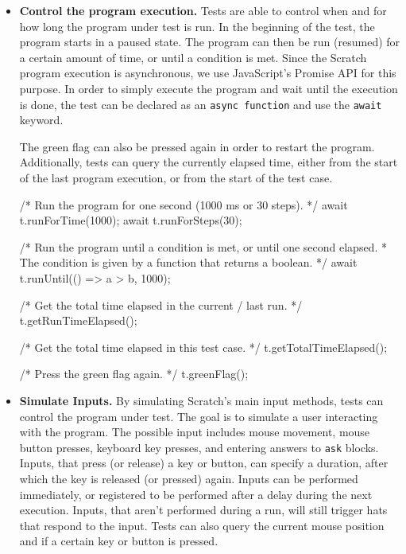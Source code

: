 \begin{itemize}
    \item \textbf{Control the program execution.}
        Tests are able to control when and for how long the program under test is run.
        In the beginning of the test, the program starts in a paused state.
        The program can then be run (resumed) for a certain amount of time, or until a condition is met.
        Since the Scratch program execution is asynchronous, we use JavaScript's Promise API for this purpose.
        In order to simply execute the program and wait until the execution is done, the test can be declared as an \texttt{async function} and use the \texttt{await} keyword.

        The green flag can also be pressed again in order to restart the program.
        Additionally, tests can query the currently elapsed time,
        either from the start of the last program execution,
        or from the start of the test case.
        \begin{javascriptcode}
            /* Run the program for one second (1000 ms or 30 steps). */
            await t.runForTime(1000);
            await t.runForSteps(30);

            /* Run the program until a condition is met, or until one second elapsed.
             * The condition is given by a function that returns a boolean. */
            await t.runUntil(() => a > b, 1000);

            /* Get the total time elapsed in the current / last run. */
            t.getRunTimeElapsed();

            /* Get the total time elapsed in this test case. */
            t.getTotalTimeElapsed();

            /* Press the green flag again. */
            t.greenFlag();
        \end{javascriptcode}
    \item \textbf{Simulate Inputs.}
        By simulating Scratch's main input methods, tests can control the program under test.
        The goal is to simulate a user interacting with the program.
        The possible input includes mouse movement, mouse button presses, keyboard key presses, and entering answers to \texttt{ask} blocks.
        Inputs, that press (or release) a key or button, can specify a duration, after which the key is released (or pressed) again.
        Inputs can be performed immediately, or registered to be performed after a delay during the next execution.
        Inputs, that aren't performed during a run, will still trigger hats that respond to the input.
        Tests can also query the current mouse position and if a certain key or button is pressed.


\end{itemize}
